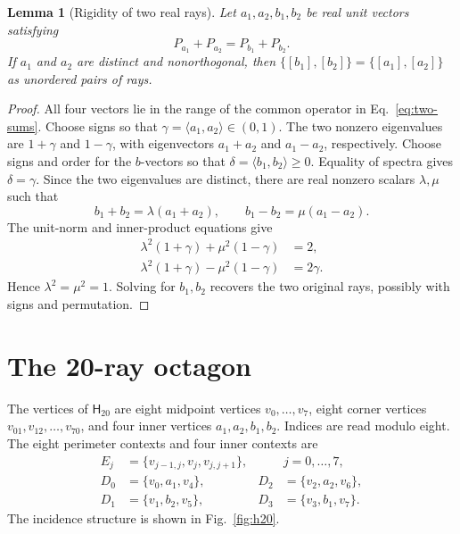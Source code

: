 \documentclass[twocolumn,aps,pra,floatfix,amsmath,amssymb,longbibliography]{revtex4-2}
\newtheorem{lemma}[theorem]{Lemma}
\theoremstyle{definition}
\theoremstyle{remark}
\newcommand{\Htwenty}{\mathsf H_{20}}
\begin{document}
\begin{lemma}[Rigidity of two real rays]
\label{lem:real-rigidity}
Let $a_1,a_2,b_1,b_2$ be real unit vectors satisfying
\begin{equation}
 P_{a_1}+P_{a_2}=P_{b_1}+P_{b_2}.
 \label{eq:two-sums}
\end{equation}
If $a_1$ and $a_2$ are distinct and nonorthogonal, then
$\{[b_1],[b_2]\}=\{[a_1],[a_2]\}$ as unordered pairs of rays.
\end{lemma}

\begin{proof}
All four vectors lie in the range of the common operator in
Eq.~\eqref{eq:two-sums}.  Choose signs so that
$\gamma=\langle a_1,a_2\rangle\in(0,1)$.  The two nonzero eigenvalues
are $1+\gamma$ and $1-\gamma$, with eigenvectors $a_1+a_2$ and
$a_1-a_2$, respectively.  Choose signs and order for the $b$-vectors so
that $\delta=\langle b_1,b_2\rangle\ge0$.  Equality of spectra gives
$\delta=\gamma$.  Since the two eigenvalues are distinct, there are real
nonzero scalars $\lambda,\mu$ such that
\[
 b_1+b_2=\lambda(a_1+a_2),\qquad
 b_1-b_2=\mu(a_1-a_2).
\]
The unit-norm and inner-product equations give
\begin{align*}
 \lambda^2(1+\gamma)+\mu^2(1-\gamma)&=2,\\
 \lambda^2(1+\gamma)-\mu^2(1-\gamma)&=2\gamma.
\end{align*}
Hence $\lambda^2=\mu^2=1$.  Solving for $b_1,b_2$ recovers the two
original rays, possibly with signs and permutation.
\end{proof}

\section{The 20-ray octagon}
\label{sec:h20}

The vertices of $\Htwenty$ are eight midpoint vertices
$v_0,\ldots,v_7$, eight corner vertices
$v_{01},v_{12},\ldots,v_{70}$, and four inner vertices
$a_1,a_2,b_1,b_2$.  Indices are read modulo eight.  The eight perimeter
contexts and four inner contexts are
\begin{align}
 E_j&=\{v_{j-1,j},v_j,v_{j,j+1}\}, &&j=0,\ldots,7,
 \label{eq:perimeter-contexts}\\
 D_0&=\{v_0,a_1,v_4\},&D_2&=\{v_2,a_2,v_6\},\nonumber\\
 D_1&=\{v_1,b_2,v_5\},&D_3&=\{v_3,b_1,v_7\}.
 \label{eq:inner-contexts}
\end{align}
The incidence structure is shown in Fig.~\ref{fig:h20}.
\end{document}
